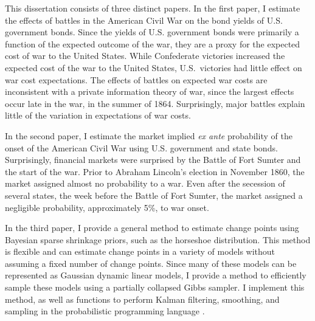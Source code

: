 
This dissertation consists of three distinct papers.
In the first paper, I estimate the effects of battles in the American Civil War on the bond yields of U.S. government bonds.
Since the yields of U.S. government bonds were primarily a function of the expected outcome of the war, they are a proxy for the expected cost of war to the United States.
While Confederate victories increased the expected cost of the war to the United States, U.S.\ victories had little effect on war cost expectations.
The effects of battles on expected war costs are inconsistent with a private information theory of war, since the largest effects occur late in the war, in the summer of 1864.
Surprisingly, major battles explain little of the variation in expectations of war costs.

In the second paper, I estimate the market implied \textit{ex ante} probability of the onset of the American Civil War using U.S. government and state bonds.
Surprisingly, financial markets were surprised by the Battle of Fort Sumter and the start of the war.
Prior to Abraham Lincoln's election in November 1860, the market assigned almost no probability to a war.
Even after the secession of several states, the week before the Battle of Fort Sumter, the market assigned a negligible probability, approximately 5\%, to war onset.

In the third paper, I provide a general method to estimate change points using Bayesian sparse shrinkage priors, such as the horseshoe distribution.
This method is flexible and can estimate change points in a variety of models without assuming a fixed number of change points.
Since many of these models can be represented as Gaussian dynamic linear models, I provide a method to efficiently sample these models using a partially collapsed Gibbs sampler. I implement this method, as well as functions to perform Kalman filtering, smoothing, and sampling in the probabilistic programming language \Stan{}.




